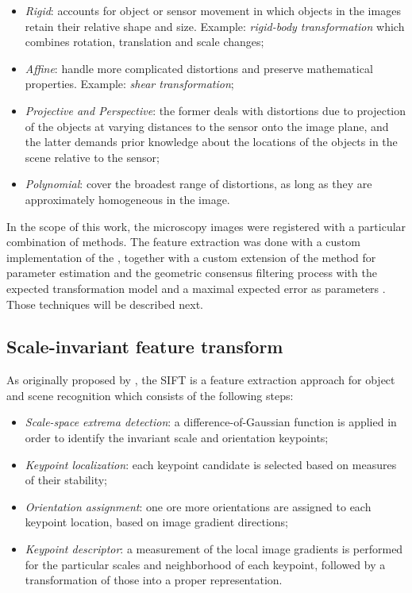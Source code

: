 \begin{itemize}
    \item \emph{Rigid}: accounts for object or sensor movement in which objects in the images retain their relative shape and size. Example: \emph{rigid-body transformation} which combines rotation, translation and scale changes; 
    
    \item \emph{Affine}: handle more complicated distortions and preserve mathematical properties. Example: \emph{shear transformation};
    
    \item \emph{Projective and Perspective}: the former deals with distortions due to projection of the objects at varying distances to the sensor onto the image plane, and the latter demands prior knowledge about the locations of the objects in the scene relative to the sensor;
    
    \item \emph{Polynomial}: cover the broadest range of distortions, as long as they are approximately homogeneous in the image.
\end{itemize}

In the scope of this work, the microscopy images were registered with a particular combination of methods. The feature extraction was done with a custom implementation of the , together with a custom extension of the  method for parameter estimation and the geometric consensus filtering process with the expected transformation model and a maximal expected error as parameters \cite{saalfeld2019computational}. Those techniques will be described next.

\subsection{Scale-invariant feature transform}

As originally proposed by , the SIFT is a feature extraction approach for object and scene recognition which consists of the following steps:

\begin{itemize}
	\item \emph{Scale-space extrema detection}: a difference-of-Gaussian function is applied in order to identify the invariant scale and orientation keypoints;
    
    \item \emph{Keypoint localization}: each keypoint candidate is selected based on measures of their stability;
    
    \item \emph{Orientation assignment}: one ore more orientations are assigned to each keypoint location, based on image gradient directions;
    
    \item \emph{Keypoint descriptor}: a measurement of the local image gradients is performed for the particular scales and neighborhood of each keypoint, followed by a    transformation of those into a proper representation.
	
\end{itemize}

